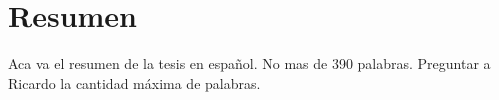 \chapter*{Resumen}
Aca va el resumen de la tesis en español. No mas de 390 palabras. {\color{red}Preguntar a Ricardo la cantidad máxima de palabras.}
